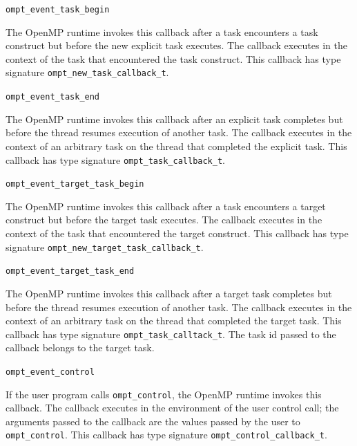 \documentclass{article}
\newcommand{\descheader}[1]{{\needspace{3\baselineskip}\vspace{1em}\noindent \fbox{#1}}}
\begin{document}
\begin{description}

\item \verb|ompt_event_task_begin|
 
The OpenMP runtime invokes this callback
after a task encounters a task construct
but before the new explicit task 
executes. The callback executes in the context of
the task that encountered the task construct.
This callback has type signature \verb|ompt_new_task_callback_t|.

\item \verb|ompt_event_task_end|   
 
\sloppy
The OpenMP runtime invokes this callback
after an explicit task completes 
but before the thread resumes execution of another task.  
The callback executes in the context of an
arbitrary task on the thread that completed the explicit task.
This callback has type signature \verb|ompt_task_callback_t|. 

\item \verb|ompt_event_target_task_begin|
 
The OpenMP runtime invokes this callback after a task encounters a target 
construct but before the target task executes. The callback executes in the 
context of the task that encountered the target construct.
This callback has type signature \verb|ompt_new_target_task_callback_t|.

\item \verb|ompt_event_target_task_end|   
 
\sloppy
The OpenMP runtime invokes this callback after a target task completes but 
before the thread resumes execution of another task. The callback executes in 
the context of an arbitrary task on the thread that completed the target task.
This callback has type signature \verb|ompt_task_calltack_t|. The task id passed to the callback belongs to the target task.

\end{description}


\descheader{Application Tool Control}

\begin{description}

\item \verb|ompt_event_control|

If the user program calls \verb|ompt_control|, the
OpenMP runtime invokes this callback.
The callback executes in the environment
of the user control call; the arguments passed to the callback are the values passed by the user to \verb|ompt_control|.
This callback has type signature \verb|ompt_control_callback_t|. 

\end{description}
\end{document}

